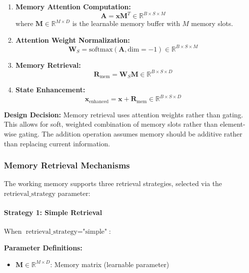 \documentclass{article}
\begin{document}
\begin{enumerate}
\item \textbf{Memory Attention Computation:}
\begin{equation}
\mathbf{A} = \mathbf{x} \mathbf{M}^T \in \mathbb{R}^{B \times S \times M}
\end{equation}
where $\mathbf{M} \in \mathbb{R}^{M \times D}$ is the learnable memory buffer with $M$ memory slots.

\item \textbf{Attention Weight Normalization:}
\begin{equation}
\mathbf{W}_S = \text{softmax}(\mathbf{A}, \text{dim}=-1) \in \mathbb{R}^{B \times S \times M}
\end{equation}

\item \textbf{Memory Retrieval:}
\begin{equation}
\mathbf{R}_{\text{mem}} = \mathbf{W}_S \mathbf{M} \in \mathbb{R}^{B \times S \times D}
\end{equation}

\item \textbf{State Enhancement:}
\begin{equation}
\mathbf{x}_{\text{enhanced}} = \mathbf{x} + \mathbf{R}_{\text{mem}} \in \mathbb{R}^{B \times S \times D}
\end{equation}
\end{enumerate}

\textbf{Design Decision:} Memory retrieval uses attention weights rather than gating. This allows for soft, weighted combination of memory slots rather than element-wise gating. The addition operation assumes memory should be additive rather than replacing current information.

\subsubsection{Memory Retrieval Mechanisms}

The working memory supports three retrieval strategies, selected via the $\text{retrieval\_strategy}$ parameter:

\paragraph{Strategy 1: Simple Retrieval}

When $\text{retrieval\_strategy} = \text{"simple"}$:

\textbf{Parameter Definitions:}
\begin{itemize}
\item $\mathbf{M} \in \mathbb{R}^{M \times D}$: Memory matrix (learnable parameter)
\end{itemize}
\end{document}
